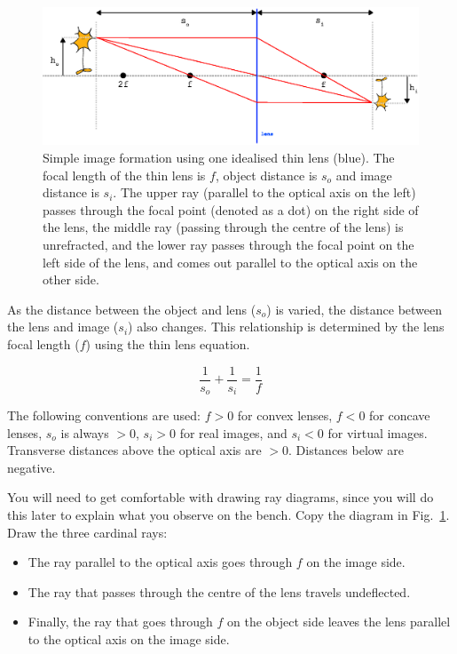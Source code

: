 \documentclass[a4paper]{report}
\begin{document}
\begin{figure}[h]
\center
\includegraphics[width=6in]{Simple_ImageFormation.eps}
\caption{Simple image formation using one idealised thin lens (blue). 
The focal length of the thin lens is $f$, object distance is $s_o$ and image distance is $s_i$. 
The upper ray (parallel to the optical axis on the left) passes through the focal point (denoted as a dot) on the right side of the lens, the middle ray (passing through the centre of the lens) is unrefracted, and the lower ray passes through the focal point on the left side of the lens, and comes out parallel to the optical axis on the other side. 
}
\label{fig:imageforming}
\end{figure}

As the distance between the object and lens ($s_o$) is varied, the distance between the lens and image ($s_i$) also changes. This relationship is determined by the lens focal length ($f$) using the thin lens equation.

\begin{equation}
\frac{1}{s_o} + \frac{1}{s_i} = \frac{1}{f}
\label{eq:thinlens}
\end{equation}

The following conventions are used: $f>0$ for convex lenses, $f<0$ for concave lenses, $s_o$ is always $>0$, $s_i>0$ for real images, and $s_i<0$ for virtual images.
Transverse distances above the optical axis are $>0$. Distances below are negative. 

\vspace{2.5em}
You will need to get comfortable with drawing ray diagrams, since you will do this later to explain what you observe on the bench.
Copy the diagram in Fig.~\ref{fig:imageforming}.
Draw the three cardinal rays:
\begin{itemize}
\item The ray parallel to the optical axis goes through $f$ on the image side.
\item The ray that passes through the centre of the lens travels undeflected.
\item Finally, the ray that goes through $f$ on the object side leaves the lens parallel to the optical axis on the image side. 
\end{itemize}
\end{document}
